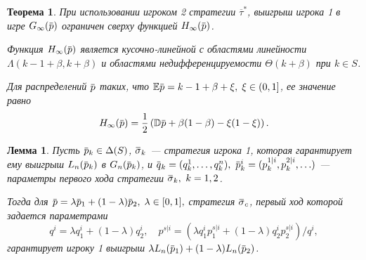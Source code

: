 \documentclass[12pt]{beamer}
\newcommand{\overbar}[1]{\mkern 1.5mu\overline{\mkern-1.3mu#1\mkern-1.3mu}\mkern 1.3mu}
\newcommand{\E}{\ensuremath{\mathbb{E}}}
\newcommand{\D}{\ensuremath{\mathbb{D}}}
\newcommand{\p}{\overbar{p}}
\newcommand{\q}{\overbar{q}}
\newcommand{\tauv}{\overline{\tau}}
\newcommand{\sigmav}{\ensuremath{\overbar{\sigma}}}
\newcommand{\theGame}[1][n]{\ensuremath{G_{#1}}}
\newcommand{\High}[1][\ensuremath{\infty}]{\ensuremath{H_{#1}}}
\newcommand{\Low}[1][\ensuremath{\infty}]{\ensuremath{L_{#1}}}
\newtheorem{thm}{Теорема}[section]
\newtheorem{lem}{Лемма}[section]
\begin{document}
\begin{frame}
  \begin{thm}
    При использовании игроком 2 стратегии $\tauv^*$, выигрыш игрока 1 в игре
    $\theGame[\infty](\p)$ ограничен сверху функцией $\High(\p)$.

    Функция $\High(\p)$ является кусочно-линейной с областями линейности $\Lambda(k - 1 + \beta, k + \beta)$ и областями недифференцируемости $\Theta(k+\beta)$ при $k \in S$.
    
    Для распределений $\p$ таких, что $\E \p = k - 1 + \beta + \xi, \; \xi \in (0, 1]$, ее значение равно
    \begin{equation}
      \label{upper-bound:eq:H(p)}
      \High(\p) = \frac{1}{2} \left( \D \p + \beta(1-\beta) - \xi(1-\xi) \right).
    \end{equation}
  \end{thm}
\end{frame}

\begin{frame}
  \begin{lem}
    Пусть $\p_k \in \Delta(S)$, $\sigmav_k$ --- стратегия игрока 1, которая гарантирует ему выигрыш $\Low[n](\p_k)$ в $\theGame[n](\p_k)$, и $\q_k = (q^1_k, \ldots, q^n_k),\ \p^i_k = ( p^{1|i}_k, p^{2|i}_k, \ldots)$ --- параметры первого хода стратегии $\sigmav_k,\ k = 1,2$.

    Тогда для $\p = \lambda \p_1 + (1-\lambda) \p_2, \; \lambda \in [0, 1],$ стратегия $\sigmav_c$, первый ход которой задается параметрами
    \begin{equation*}
      q^i = \lambda q^i_1 + (1-\lambda) q^i_2, \quad
      p^{s|i} = \left(\lambda q^i_1 p^{s|i}_1 + (1-\lambda) q^i_2 p^{s|i}_2\right)/q^i,
    \end{equation*}
    гарантирует игроку 1 выигрыш $\lambda \Low[n](\p_1) + (1-\lambda) \Low[n](\p_2)$.
  \end{lem}

  \begin{figure}[tb]
    \centering
  \end{figure}
\end{frame}
\end{document}

